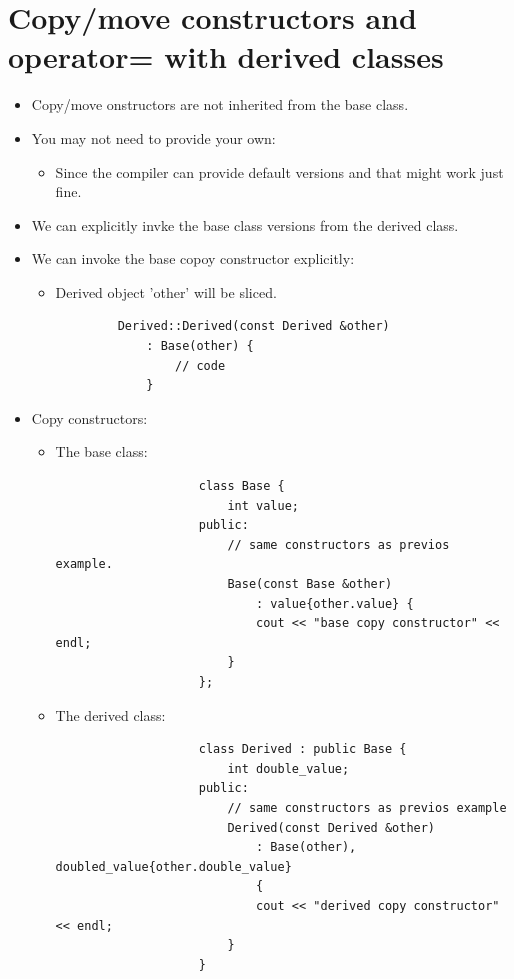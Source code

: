 \section{Copy/move constructors and operator= with derived classes}
\begin{itemize}
    \item Copy/move onstructors are not inherited from the base class.
    \item You may not need to provide your own:
        \begin{itemize}
            \item Since the compiler can provide default versions and that might work just fine.
        \end{itemize}
    
    \item We can explicitly invke the base class versions from the derived class.
    \item We can invoke the base copoy constructor explicitly:
        \begin{itemize}
            \item Derived object 'other' will be sliced.
        \end{itemize}
        \begin{verbatim}
            Derived::Derived(const Derived &other) 
                : Base(other) {
                    // code
                }
        \end{verbatim}
    
    \item Copy constructors:
        \begin{itemize}
            \item The base class:
                \begin{verbatim}
                    class Base {
                        int value;
                    public:
                        // same constructors as previos example.
                        Base(const Base &other) 
                            : value{other.value} {
                            cout << "base copy constructor" << endl;
                        }
                    };
                \end{verbatim}
            
            \item The derived class:
                \begin{verbatim}
                    class Derived : public Base {
                        int double_value;
                    public:
                        // same constructors as previos example
                        Derived(const Derived &other) 
                            : Base(other), doubled_value{other.double_value} 
                            {
                            cout << "derived copy constructor" << endl;
                        }
                    }
                \end{verbatim}
        \end{itemize}
    

\end{itemize}

